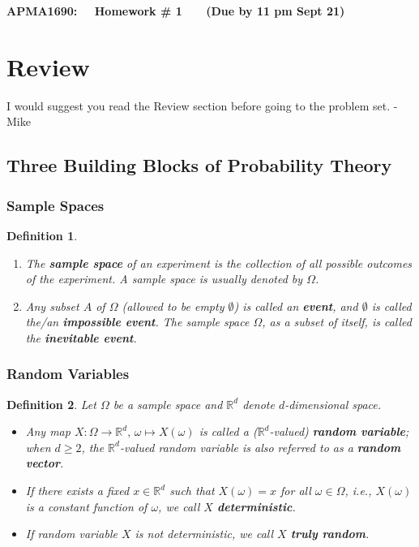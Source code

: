 \documentclass[11pt,letterpaper, leqno]{article}
\newtheorem{definition}{Definition}
\numberwithin{equation}{section}
\numberwithin{theorem}{section}
\numberwithin{lemma}{section}
\numberwithin{corollary}{section}
\numberwithin{definition}{section}
\numberwithin{proposition}{section}
\numberwithin{remark}{section}
\numberwithin{example}{section}
\begin{document}
\begin{center}
{\bf \large APMA1690: ~~Homework \# 1 ~~~(Due by 11 pm Sept 21)}
\end{center}
 
\medskip

\section{Review}

I would suggest you read the Review section before going to the problem set. - Mike

\subsection{Three Building Blocks of Probability Theory}

\subsubsection{Sample Spaces}

\begin{definition}
\begin{enumerate}
        \item The \textbf{sample space} of an experiment is the collection of all possible outcomes of the experiment. A sample space is usually denoted by $\Omega$.
        
        \item Any subset $A$ of $\Omega$ (allowed to be empty $\emptyset$) is called an \textbf{event}, and $\emptyset$ is called the/an \textbf{impossible event}. The sample space $\Omega$, as a subset of itself, is called the \textbf{inevitable event}.
    \end{enumerate}
\end{definition}

\subsubsection{Random Variables}

\begin{definition}\label{def: random variables}
    Let $\Omega$ be a sample space and $\mathbb{R}^d$ denote $d$-dimensional space. 
    \begin{itemize}
        \item Any map $X: \Omega \rightarrow \mathbb{R}^d,\, \omega\mapsto X(\omega)$ is called a ($\mathbb{R}^d$-valued) \textbf{random variable}; when $d\ge 2$, the $\mathbb{R}^d$-valued random variable is also referred to as a \textbf{random vector}.
        
        \item If there exists a fixed $x\in\mathbb{R}^d$ such that $X(\omega)=x$ for all $\omega\in\Omega$, i.e., $X(\omega)$ is a constant function of $\omega$, we call $X$ \textbf{deterministic}. 
        
        \item If random variable $X$ is not deterministic, we call $X$ \textbf{truly random}.
    \end{itemize}
\end{definition}
\end{document}
